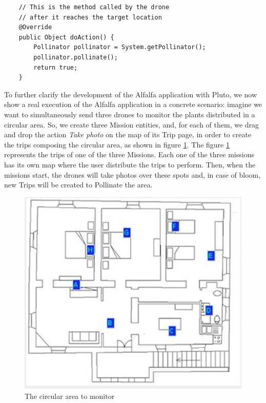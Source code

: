 \begin{lstlisting}
	// This is the method called by the drone
	// after it reaches the target location
	@Override
	public Object doAction() {
		Pollinator pollinator = System.getPollinator();
		pollinator.pollinate();
		return true;
	}
\end{lstlisting}


To further clarify the development of the Alfalfa\cite{alfalfa} application with Pluto, we now show a real execution of the Alfalfa application in a concrete scenario:
imagine we want to simultaneously send three drones to monitor the plants distributed in a circular area.
So, we create three Mission entities, and, for each of them, we drag and drop the action \textit{Take photo} on the map of its Trip page, in order to create the trips composing the circular area, as shown in figure \ref{fig:alfalfaArea}.
The figure \ref{fig:alfalfaArea} represents the trips of one of the three Missions.
Each one of the three missions has its own map where the user distribute the trips to perform.
Then, when the missions start, the drones will take photos over these spots and, in case of bloom, new Trips will be created to Pollinate the area.

\begin{figure}[H]
  \centering
  \includegraphics[width=\linewidth]{pictures/alfalfaArea.png}
  \caption{The circular area to monitor}
  \label{fig:alfalfaArea}
\end{figure}


